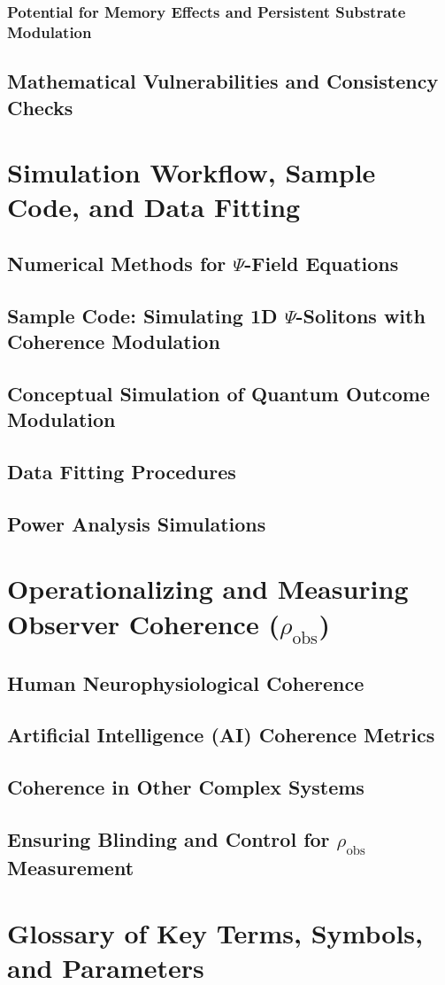 \documentclass[11pt, a4paper]{book}
\begin{document}
\subsection{Potential for Memory Effects and Persistent Substrate Modulation}

\section{Mathematical Vulnerabilities and Consistency Checks}

\chapter{Simulation Workflow, Sample Code, and Data Fitting}
\label{app:simulations}
\section{Numerical Methods for $\Psi$-Field Equations}
\section{Sample Code: Simulating 1D $\Psi$-Solitons with Coherence Modulation}
\section{Conceptual Simulation of Quantum Outcome Modulation}
\section{Data Fitting Procedures}
\section{Power Analysis Simulations}

\chapter{Operationalizing and Measuring Observer Coherence ($\rho_{\text{obs}}$)}
\label{app:operationalizingcoherence}
\section{Human Neurophysiological Coherence}
\section{Artificial Intelligence (AI) Coherence Metrics}
\section{Coherence in Other Complex Systems}
\section{Ensuring Blinding and Control for $\rho_{\text{obs}}$ Measurement}

\chapter{Glossary of Key Terms, Symbols, and Parameters}
\label{app:glossary}
\end{document}
